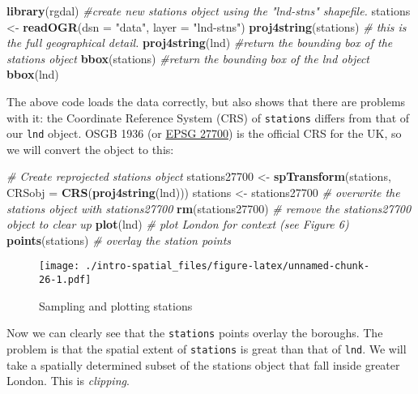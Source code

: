 \documentclass[]{article}
\newenvironment{Shaded}{}{}
\newcommand{\KeywordTok}[1]{\textcolor[rgb]{0.00,0.44,0.13}{\textbf{{#1}}}}
\newcommand{\DataTypeTok}[1]{\textcolor[rgb]{0.56,0.13,0.00}{{#1}}}
\newcommand{\StringTok}[1]{\textcolor[rgb]{0.25,0.44,0.63}{{#1}}}
\newcommand{\CommentTok}[1]{\textcolor[rgb]{0.38,0.63,0.69}{\textit{{#1}}}}
\newcommand{\NormalTok}[1]{{#1}}
\begin{document}
\begin{Shaded}
\begin{Highlighting}[]
\KeywordTok{library}\NormalTok{(rgdal)}
\CommentTok{#create new stations object using the "lnd-stns" shapefile.}
\NormalTok{stations <-}\StringTok{ }\KeywordTok{readOGR}\NormalTok{(}\DataTypeTok{dsn =} \StringTok{"data"}\NormalTok{, }\DataTypeTok{layer =} \StringTok{"lnd-stns"}\NormalTok{)}
\KeywordTok{proj4string}\NormalTok{(stations) }\CommentTok{# this is the full geographical detail.}
\KeywordTok{proj4string}\NormalTok{(lnd)}
\CommentTok{#return the bounding box of the stations object}
\KeywordTok{bbox}\NormalTok{(stations)}
\CommentTok{#return the bounding box of the lnd object}
\KeywordTok{bbox}\NormalTok{(lnd)}
\end{Highlighting}
\end{Shaded}

The above code loads the data correctly, but also shows that there are
problems with it: the Coordinate Reference System (CRS) of
\texttt{stations} differs from that of our \texttt{lnd} object. OSGB
1936 (or \href{http://spatialreference.org/ref/epsg/27700/}{EPSG 27700})
is the official CRS for the UK, so we will convert the object to this:

\begin{Shaded}
\begin{Highlighting}[]
\CommentTok{# Create reprojected stations object}
\NormalTok{stations27700 <-}\StringTok{ }\KeywordTok{spTransform}\NormalTok{(stations, }\DataTypeTok{CRSobj =} \KeywordTok{CRS}\NormalTok{(}\KeywordTok{proj4string}\NormalTok{(lnd)))}
\NormalTok{stations <-}\StringTok{ }\NormalTok{stations27700 }\CommentTok{# overwrite the stations object with stations27700}
\KeywordTok{rm}\NormalTok{(stations27700) }\CommentTok{# remove the stations27700 object to clear up}
\KeywordTok{plot}\NormalTok{(lnd) }\CommentTok{# plot London for context (see Figure 6)}
\KeywordTok{points}\NormalTok{(stations) }\CommentTok{# overlay the station points}
\end{Highlighting}
\end{Shaded}

\begin{figure}[htbp]
\centering
\texttt{[image: ./intro-spatial\_files/figure-latex/unnamed-chunk-26-1.pdf]}
\caption{Sampling and plotting stations}
\end{figure}

Now we can clearly see that the \texttt{stations} points overlay the
boroughs. The problem is that the spatial extent of \texttt{stations} is
great than that of \texttt{lnd}. We will take a spatially determined
subset of the stations object that fall inside greater London. This is
\emph{clipping}.
\end{document}
